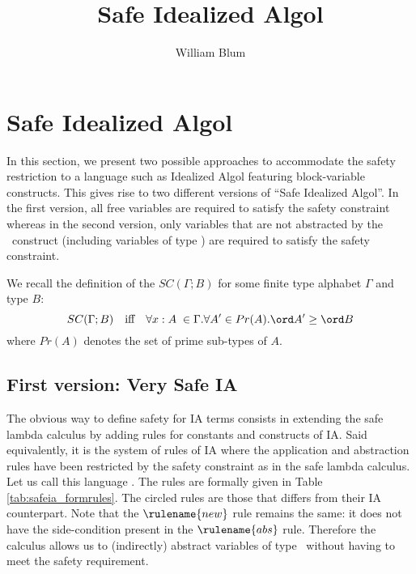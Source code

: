 



\author{William Blum}
\title{Safe Idealized Algol}


\maketitle

\section{Safe Idealized Algol}

In this section, we present two possible approaches to accommodate
the safety restriction to a language such as Idealized Algol
featuring block-variable constructs. This gives rise to two
different versions of ``Safe Idealized Algol''. In the first
version, all free variables are required to satisfy the safety
constraint whereas in the second version, only variables that are
not abstracted by the \ianew\ construct (including variables of type
\iavar) are required to satisfy the safety constraint.

We recall the definition of the  $SC(\Gamma ; B)$
for some finite type alphabet $\Gamma$ and type $B$:
$$SC(\Gamma ; B) \quad \mbox{iff} \quad  \forall x:A\; \in \Gamma . \forall A' \in Pr(A) . \ord A' \geq \ord B$$
where $Pr(A)$ denotes the set of prime sub-types of $A$.



\subsection{First version: Very Safe IA}

 The obvious way to define safety for IA terms consists in extending the safe lambda calculus by adding rules
 for constants and constructs of IA.
Said equivalently, it is the system of rules of IA where the
application and abstraction rules  have been restricted by the
safety constraint as in the safe lambda calculus. Let us call this
language . The rules are formally given in
Table \ref{tab:safeia_formrules}. The circled rules are those that
differs from their IA counterpart. Note that the $\rulename{new}$
rule remains the same: it does not have the side-condition present
in the $\rulename{abs}$ rule. Therefore the calculus allows us to
(indirectly) abstract variables of type \iavar\ without having to
meet the safety requirement.



